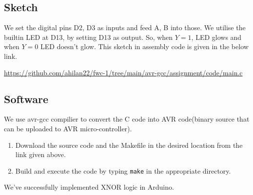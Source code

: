 \documentclass[journal,12pt,twocolumn]{IEEEtran}
\let\oldtexttt\texttt
\renewcommand{\texttt}[1]{%
	\colorbox{bgcolor}{\oldtexttt{#1}}}
\begin{document}
\subsection{Sketch}
We set the digital pins D2, D3 as inputs and feed A, B into those. We utilise the builtin LED at D13, by setting D13 as output. So, when $Y=1$, LED glows and when $Y=0$ LED doesn't glow. This sketch in assembly code is given in the below link.

\bigskip
\url{https://github.com/ahilan22/fwc-1/tree/main/avr-gcc/assignment/code/main.c}

\subsection{Software}
We use avr-gcc compilier to convert the C code into AVR code(binary source that can be uploaded to AVR micro-controller).
\bigskip

\begin{enumerate}
	\item Download the source code and the Makefile in the desired location from the link given above.
	\item Build and execute the code by typing \texttt{make} in the appropriate directory.
\end{enumerate}
\bigskip
We've successfully implemented XNOR logic in Arduino.
\end{document}
